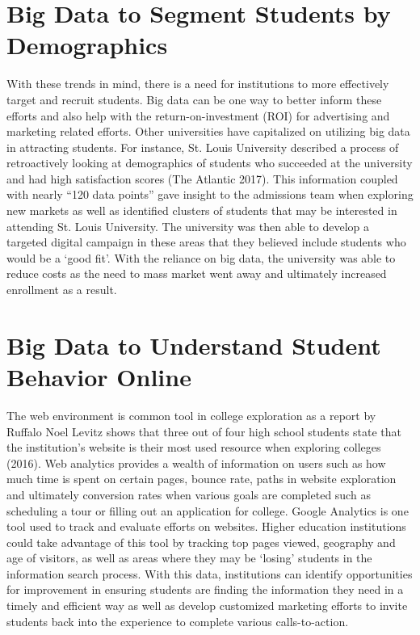 \documentclass[sigconf]{acmart}
\begin{document}
\section{Big Data to Segment Students by Demographics}
With these trends in mind, there is a need for institutions to more effectively target and recruit students. Big data can be one way to better inform these efforts and also help with the return-on-investment (ROI) for advertising and marketing related efforts. Other universities have capitalized on utilizing big data in attracting students. For instance, St. Louis University described a process of retroactively looking at demographics of students who succeeded at the university and had high satisfaction scores (The Atlantic 2017). This information coupled with nearly “120 data points” gave insight to the admissions team when exploring new markets as well as identified clusters of students that may be interested in attending St. Louis University. The university was then able to develop a targeted digital campaign in these areas that they believed include students who would be a ‘good fit’. With the reliance on big data, the university was able to reduce costs as the need to mass market went away and ultimately increased enrollment as a result.  

\section{Big Data to Understand Student Behavior Online}
The web environment is common tool in college exploration as a report by Ruffalo Noel Levitz shows that three out of four high school students state that the institution’s website is their most used resource when exploring colleges (2016). Web analytics provides a wealth of information on users such as how much time is spent on certain pages, bounce rate, paths in website exploration and ultimately conversion rates when various goals are completed such as scheduling a tour or filling out an application for college. Google Analytics is one tool used to track and evaluate efforts on websites. Higher education institutions could take advantage of this tool by tracking top pages viewed, geography and age of visitors, as well as areas where they may be ‘losing’ students in the information search process. With this data, institutions can identify opportunities for improvement in ensuring students are finding the information they need in a timely and efficient way as well as develop customized marketing efforts to invite students back into the experience to complete various calls-to-action. 
\end{document}
